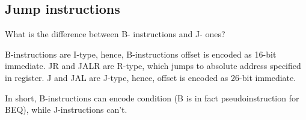 \subsection{Jump instructions}

What is the difference between B- instructions and J- ones?

B-instructions are I-type, hence, B-instructions offset is encoded as 16-bit immediate.
JR and JALR are R-type, which jumps to absolute address specified in register.
J and JAL are J-type, hence, offset is encoded as 26-bit immediate.

In short, B-instructions can encode condition (B is in fact pseudoinstruction for BEQ), 
while J-instructions can't.

\fi
